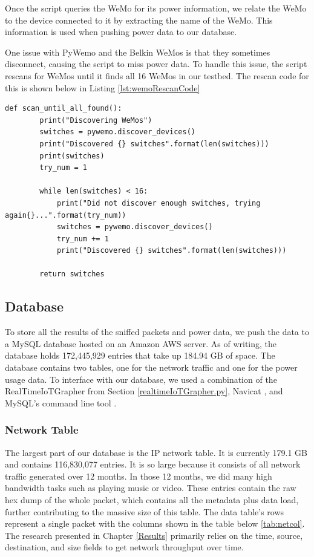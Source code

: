 Once the script queries the WeMo for its power information, we relate the WeMo to the device connected to it by extracting the name of the WeMo. This information is used when pushing power data to our database.

One issue with PyWemo and the Belkin WeMos is that they sometimes disconnect, causing the script to miss power data. To handle this issue, the script rescans for WeMos until it finds all 16 WeMos in our testbed. The rescan code for this is shown below in Listing \ref{lst:wemoRescanCode}

\noindent
\begin{minipage}{\textwidth}
\begin{lstlisting}[label={lst:wemoRescanCode},caption={Rescan if all WeMos not found.}]
    def scan_until_all_found():
        print("Discovering WeMos")
        switches = pywemo.discover_devices()
        print("Discovered {} switches".format(len(switches)))
        print(switches)
        try_num = 1

        while len(switches) < 16:
            print("Did not discover enough switches, trying again{}...".format(try_num))
            switches = pywemo.discover_devices()
            try_num += 1
            print("Discovered {} switches".format(len(switches)))

        return switches
\end{lstlisting}
\end{minipage}

\subsection{Database}
\label{Database}

To store all the results of the sniffed packets and power data, we push the data to a MySQL database hosted on an Amazon AWS server. As of writing, the database holds 172,445,929 entries that take up 184.94 GB of space. The database contains two tables, one for the network traffic and one for the power usage data. To interface with our database, we used a combination of the RealTimeIoTGrapher from Section \ref{realtimeIoTGrapher.py}, Navicat \cite{navicat}, and MySQL’s command line tool \cite{mysqlCommandline}.

\subsubsection{Network Table}
\label{Network Table}
The largest part of our database is the IP network table. It is currently 179.1 GB and contains 116,830,077 entries. It is so large because it consists of all network traffic generated over 12 months. In those 12 months, we did many high bandwidth tasks such as playing music or video. These entries contain the raw hex dump of the whole packet, which contains all the metadata plus data load, further contributing to the massive size of this table. The data table's rows represent a single packet with the columns shown in the table below \ref{tab:netcol}. The research presented in Chapter \ref{Results} primarily relies on the time, source, destination, and size fields to get network throughput over time.

